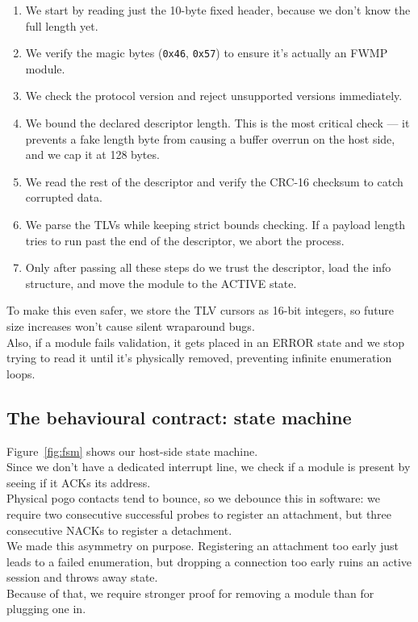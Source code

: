 \documentclass[12pt, a4paper]{article}
\begin{document}
\begin{enumerate}
  \item We start by reading just the 10-byte fixed header, because we don't know the full length yet.
  \item We verify the magic bytes (\texttt{0x46}, \texttt{0x57}) to ensure it's actually an FWMP module.
  \item We check the protocol version and reject unsupported versions immediately.
  \item We bound the declared descriptor length. This is the most critical check --- it prevents a fake length byte from causing a buffer overrun on the host side, and we cap it at 128 bytes.
  \item We read the rest of the descriptor and verify the CRC-16 checksum to catch corrupted data.
  \item We parse the TLVs while keeping strict bounds checking. If a payload length tries to run past the end of the descriptor, we abort the process.
  \item Only after passing all these steps do we trust the descriptor, load the info structure, and move the module to the ACTIVE state.
\end{enumerate}
To make this even safer, we store the TLV cursors as 16-bit integers, so future size increases won't cause silent wraparound bugs. \\
Also, if a module fails validation, it gets placed in an ERROR state and we stop trying to read it until it's physically removed, preventing infinite enumeration loops.

\subsection{The behavioural contract: state machine}

Figure~\ref{fig:fsm} shows our host-side state machine. \\
Since we don't have a dedicated interrupt line, we check if a module is present by seeing if it ACKs its  address. \\
Physical pogo contacts tend to bounce, so we debounce this in software: we require two consecutive successful probes to register an attachment, but three consecutive NACKs to register a detachment. \\
We made this asymmetry on purpose. Registering an attachment too early just leads to a failed enumeration, but dropping a connection too early ruins an active session and throws away state. \\
Because of that, we require stronger proof for removing a module than for plugging one in.
\end{document}
